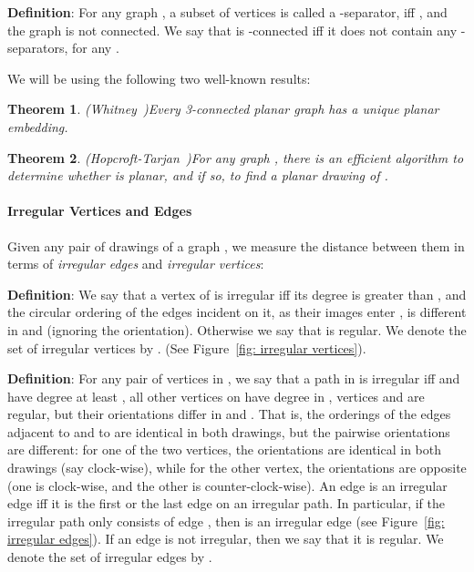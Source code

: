 \documentclass[twoside,leqno,twocolumn]{article}
\newtheorem{theorem}{Theorem}
\newenvironment{Definition}{{\bf Definition}: }{}
\begin{document}
\begin{Definition} For any graph , a subset  of vertices is called a -separator, iff , and the graph  is not connected. We say that  is -connected iff it does not contain any -separators, for any .
 \end{Definition}
 
We will be using the following two well-known results:

\begin{theorem} (Whitney~\cite{Whitney})\label{thm:Whitney} Every 3-connected planar graph has a unique planar embedding.
\end{theorem}

\begin{theorem}(Hopcroft-Tarjan~\cite{planar-drawing})\label{thm:planar drawing}
For any graph , there is an efficient algorithm to determine whether  is planar, and if so, to find a planar drawing of .
\end{theorem}

\paragraph{Irregular Vertices and Edges}
Given any pair  of drawings of a graph , we measure the distance between them in terms of \textit{irregular edges} and \textit{irregular vertices}:

\begin{Definition}
We say that a vertex  of  is irregular iff its degree is greater than , 
and the circular ordering of the edges incident on it, as their images enter , is different in  and  (ignoring the orientation). Otherwise we say that  is regular.
We denote the set of irregular vertices by . (See Figure~\ref{fig: irregular vertices}).
\end{Definition}

\begin{Definition}
For any pair  of vertices in ,
we say that a path  in  is irregular iff  and  have degree at least , all other
vertices on  have degree  in , vertices  and  are regular, but their
orientations differ in  and . That is, the orderings of the edges adjacent to  and to  are identical in both drawings, but the pairwise orientations are different: for one of the two vertices, the orientations are identical in both drawings (say clock-wise), while for the other vertex, the orientations are opposite (one is clock-wise, and the other is counter-clock-wise). An edge  is an irregular edge iff it is the first or the last edge on an irregular path. In particular, if the irregular path only consists of edge , then  is an irregular edge (see Figure~\ref{fig: irregular edges}). If an edge is not irregular, then we say that it is regular.
We denote the set of irregular edges by .
\end{Definition}
\end{document}
